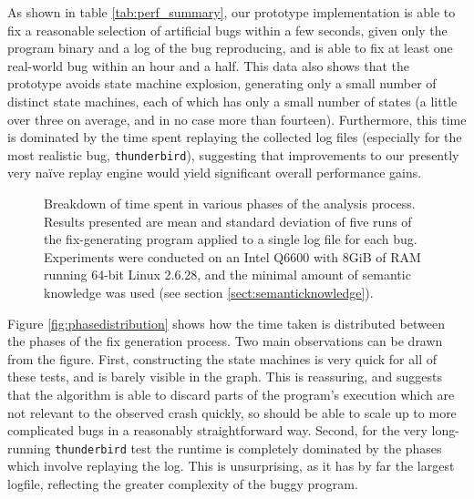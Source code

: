 \documentclass[10pt,twocolumn,preprint,natbib,authoryear]{sigplanconf}
\newcommand{\editorial}[1]{}
\begin{document}
As shown in table \ref{tab:perf_summary}, our prototype implementation
is able to fix a reasonable selection of artificial bugs within a few
seconds, given only the program binary and a log of the bug
reproducing, and is able to fix at least one real-world bug within an
hour and a half.  This data also shows that the prototype avoids state
machine explosion, generating only a small number of distinct state
machines, each of which has only a small number of states (a little
over three on average, and in no case more than fourteen).
Furthermore, this time is dominated by the time spent replaying the
collected log files (especially for the most realistic bug,
\verb|thunderbird|), suggesting that improvements to our presently
very na\"ive replay engine would yield significant overall performance
gains.

\begin{figure*}
\hspace{10mm} 
\caption{Breakdown of time spent in various phases of the analysis
  process.  Results presented are mean and standard deviation of five
  runs of the fix-generating program applied to a single log file for
  each bug.  Experiments were conducted on an Intel Q6600 with 8GiB of
  RAM running 64-bit Linux 2.6.28, and the minimal amount of semantic
  knowledge was used (see section \ref{sect:semanticknowledge}).}
\end{figure*}

Figure \ref{fig:phasedistribution} shows how the time taken is
distributed between the phases of the fix generation process.  Two
main observations can be drawn from the figure.  First, constructing
the state machines is very quick for all of these tests, and is barely
visible in the graph.  This is reassuring, and suggests that the
algorithm is able to discard parts of the program's execution which
are not relevant to the observed crash quickly, so should be able to
scale up to more complicated bugs in a reasonably straightforward
way\editorial{Not sure I believe that}.  Second, for the very
long-running \verb|thunderbird| test the runtime is completely
dominated by the phases which involve replaying the log.  This is
unsurprising, as it has by far the largest logfile, reflecting the
greater complexity of the buggy program.
\end{document}
